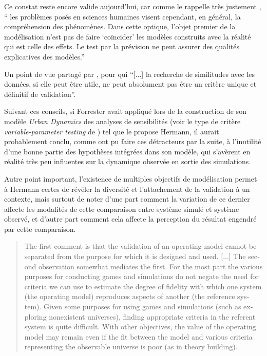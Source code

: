 Ce constat reste encore valide aujourd'hui, car comme le rappelle très justement \textcite[32]{Bulle2005}, \enquote{ les problèmes posés en sciences humaines visent cependant, en général, la compréhension des phénomènes. Dans cette optique, l’objet premier de la modélisation n’est pas de faire \enquote{coïncider} les modèles construits avec la réalité qui est celle des effets. Le test par la prévision ne peut assurer des qualités explicatives des modèles.}

Un point de vue partagé par \textcite[106]{Amblard2006}, pour qui \enquote{[...] la recherche de similitudes avec les données, si elle peut être utile, ne peut absolument pas être un critère unique et définitif de validation}.

Suivant ces conseils, si Forrester avait appliqué lors de la construction de son modèle \textit{Urban Dynamics} des analyses de sensibilités (voir le type de critère \textit{variable-parameter testing} de \autocite{Hermann1967}) tel que le propose Hermann, il aurait probablement conclu, comme ont pu faire ces détracteurs par la suite, à l'inutilité d'une bonne partie des hypothèses intégrées dans son modèle, qui s'avèrent en réalité très peu influentes sur la dynamique observée en sortie des simulations.

Autre point important, l'existence de multiples objectifs de modélisation permet à Hermann certes de révéler la diversité et l'attachement de la validation à un contexte, mais surtout de noter d'une part comment la variation de ce dernier affecte les modalités de cette comparaison entre système simulé et système observé, et d'autre part comment cela affecte la perception du résultat engendré par cette comparaison.

\foreignblockquote{english}[{\cite[219]{Hermann1967}}]{The first comment is that the validation of an operating model cannot be separated from the purpose for which it is designed and used. [...] The second observation somewhat mediates the first. For the most part the various purposes for conducting games and simulations do not negate the need for criteria we can use to estimate the degree of fidelity with which one system (the operating model) reproduces aspects of another (the reference system). Given some purposes for using games and simulations (such as exploring nonexistent universes), finding appropriate criteria in the referent system is quite difficult. With other objectives, the value of the operating model may remain even if the fit between the model and various criteria representing the observable universe is poor (as in theory building).}

